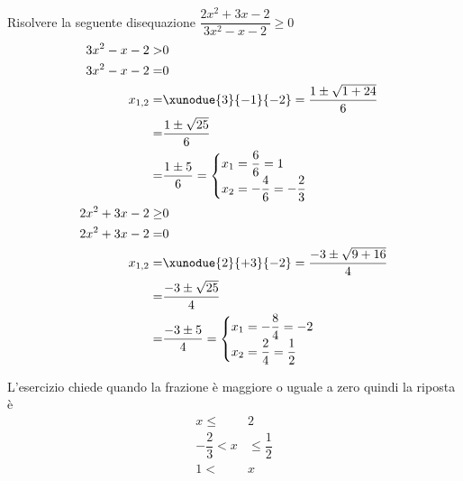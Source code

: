 	Risolvere la seguente disequazione $\dfrac{2x^2+3x-2}{3x^2-x-2}\geq 0$
\begin{align*}
3x^2-x-2>&0\\
3x^2-x-2=&0\\
x_{1,2}=&\xunodue{3}{-1}{-2}=\dfrac{1\pm\sqrt{1+24}}{6}\\
=&\dfrac{1\pm\sqrt{25}}{6}\\
=&\dfrac{1\pm 5}{6}=\begin{cases}
x_1=\dfrac{6}{6}=1\\
x_2=-\dfrac{4}{6}=-\dfrac{2}{3}
\end{cases}\\
2x^2+3x-2\geq&0\\
2x^2+3x-2=&0\\
x_{1,2}=&\xunodue{2}{+3}{-2}=\dfrac{-3\pm\sqrt{9+16}}{4}\\
=&\dfrac{-3\pm\sqrt{25}}{4}\\
=&\dfrac{-3\pm 5}{4}=\begin{cases}
x_1=-\dfrac{8}{4}=-2\\
x_2=\dfrac{2}{4}=\dfrac{1}{2}
\end{cases}\\
\end{align*}
\begin{center}
	
\end{center}
L'esercizio chiede quando la frazione è maggiore o uguale a zero quindi la riposta è
\begin{align*}
x\leq& 2\\ -\dfrac{2}{3}<x&\leq \dfrac{1}{2}\\ 1<&x\\
\end{align*}
